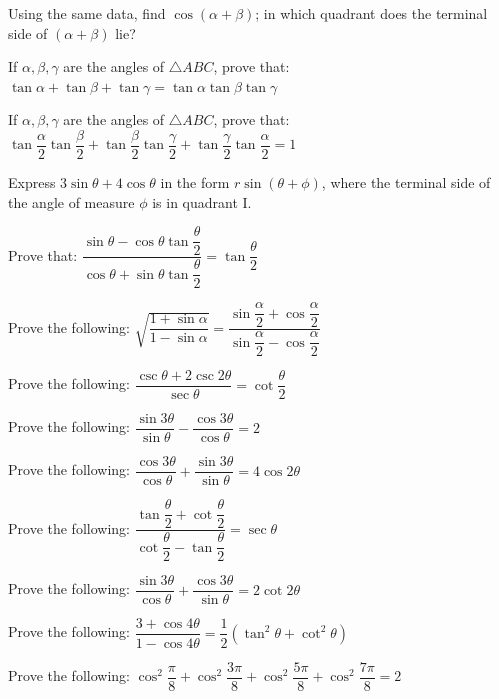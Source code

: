 \documentclass[11pt,a4paper]{article}
\begin{document}
\begin{longlist}
\item Using the same data, find $\cos(\alpha+\beta)$; in which quadrant does the terminal side of $(\alpha+\beta)$ lie?

\item If $\alpha,\beta,\gamma$ are the angles of $\triangle ABC$, prove that: $\tan\alpha+\tan\beta+\tan\gamma=\tan\alpha\tan\beta\tan\gamma$

\item If $\alpha,\beta,\gamma$ are the angles of $\triangle ABC$, prove that: $\tan\dfrac{\alpha}{2}\tan\dfrac{\beta}{2}+\tan\dfrac{\beta}{2}\tan\dfrac{\gamma}{2}+\tan\dfrac{\gamma}{2}\tan\dfrac{\alpha}{2}=1$

\item Express $3\sin\theta+4\cos\theta$ in the form $r\sin(\theta+\phi)$, where the terminal side of the angle of measure $\phi$ is in quadrant I.

\item Prove that: $\dfrac{\sin\theta-\cos\theta\tan\dfrac{\theta}{2}}{\cos\theta+\sin\theta\tan\dfrac{\theta}{2}}=\tan\dfrac{\theta}{2}$

\item Prove the following: $\sqrt{\dfrac{1+\sin\alpha}{1-\sin\alpha}}=\dfrac{\sin\dfrac{\alpha}{2}+\cos\dfrac{\alpha}{2}}{\sin\dfrac{\alpha}{2}-\cos\dfrac{\alpha}{2}}$

\item Prove the following: $\dfrac{\csc\theta+2\csc2\theta}{\sec\theta}=\cot\dfrac{\theta}{2}$

\item Prove the following: $\dfrac{\sin3\theta}{\sin\theta}-\dfrac{\cos3\theta}{\cos\theta}=2$

\item Prove the following: $\dfrac{\cos3\theta}{\cos\theta}+\dfrac{\sin3\theta}{\sin\theta}=4\cos2\theta$

\item Prove the following: $\dfrac{\tan\dfrac{\theta}{2}+\cot\dfrac{\theta}{2}}{\cot\dfrac{\theta}{2}-\tan\dfrac{\theta}{2}}=\sec\theta$

\item Prove the following: $\dfrac{\sin3\theta}{\cos\theta}+\dfrac{\cos3\theta}{\sin\theta}=2\cot2\theta$

\item Prove the following: $\dfrac{3+\cos4\theta}{1-\cos4\theta}=\dfrac{1}{2}\left(\tan^2\theta+\cot^2\theta\right)$

\item Prove the following: $\cos^2\dfrac{\pi}{8}+\cos^2\dfrac{3\pi}{8}+\cos^2\dfrac{5\pi}{8}+\cos^2\dfrac{7\pi}{8}=2$


\end{longlist}
\end{document}
